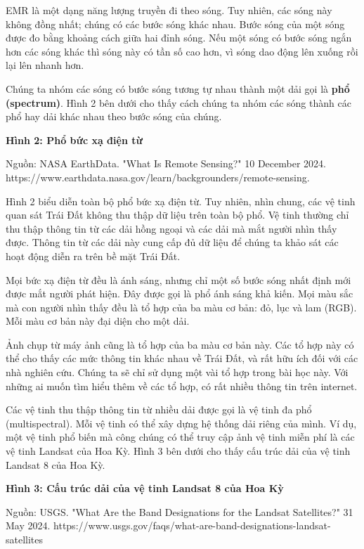 EMR là một dạng năng lượng truyền đi theo sóng. Tuy nhiên, các sóng này không đồng nhất; chúng có các bước sóng khác nhau. Bước sóng của một sóng được đo bằng khoảng cách giữa hai đỉnh sóng. Nếu một sóng có bước sóng ngắn hơn các sóng khác thì sóng này có tần số cao hơn, vì sóng dao động lên xuống rồi lại lên nhanh hơn.

Chúng ta nhóm các sóng có bước sóng tương tự nhau thành một dải gọi là \textbf{phổ (spectrum)}. Hình 2 bên dưới cho thấy cách chúng ta nhóm các sóng thành các phổ hay dải khác nhau theo bước sóng của chúng.

\textbf{Hình 2: Phổ bức xạ điện từ}

Nguồn: NASA EarthData. "What Is Remote Sensing?" 10 December 2024. https://www.earthdata.nasa.gov/learn/backgrounders/remote-sensing.

Hình 2 biểu diễn toàn bộ phổ bức xạ điện từ. Tuy nhiên, nhìn chung, các vệ tinh quan sát Trái Đất không thu thập dữ liệu trên toàn bộ phổ. Vệ tinh thường chỉ thu thập thông tin từ các dải hồng ngoại và các dải mà mắt người nhìn thấy được. Thông tin từ các dải này cung cấp đủ dữ liệu để chúng ta khảo sát các hoạt động diễn ra trên bề mặt Trái Đất.

Mọi bức xạ điện từ đều là ánh sáng, nhưng chỉ một số bước sóng nhất định mới được mắt người phát hiện. Đây được gọi là phổ ánh sáng khả kiến. Mọi màu sắc mà con người nhìn thấy đều là tổ hợp của ba màu cơ bản: đỏ, lục và lam (RGB). Mỗi màu cơ bản này đại diện cho một dải.

Ảnh chụp từ máy ảnh cũng là tổ hợp của ba màu cơ bản này. Các tổ hợp này có thể cho thấy các mức thông tin khác nhau về Trái Đất, và rất hữu ích đối với các nhà nghiên cứu. Chúng ta sẽ chỉ sử dụng một vài tổ hợp trong bài học này. Với những ai muốn tìm hiểu thêm về các tổ hợp, có rất nhiều thông tin trên internet.

Các vệ tinh thu thập thông tin từ nhiều dải được gọi là vệ tinh đa phổ (multispectral). Mỗi vệ tinh có thể xây dựng hệ thống dải riêng của mình. Ví dụ, một vệ tinh phổ biến mà công chúng có thể truy cập ảnh vệ tinh miễn phí là các vệ tinh Landsat của Hoa Kỳ. Hình 3 bên dưới cho thấy cấu trúc dải của vệ tinh Landsat 8 của Hoa Kỳ.

\textbf{Hình 3: Cấu trúc dải của vệ tinh Landsat 8 của Hoa Kỳ}

Nguồn: USGS. "What Are the Band Designations for the Landsat Satellites?" 31 May 2024. https://www.usgs.gov/faqs/what-are-band-designations-landsat-satellites

